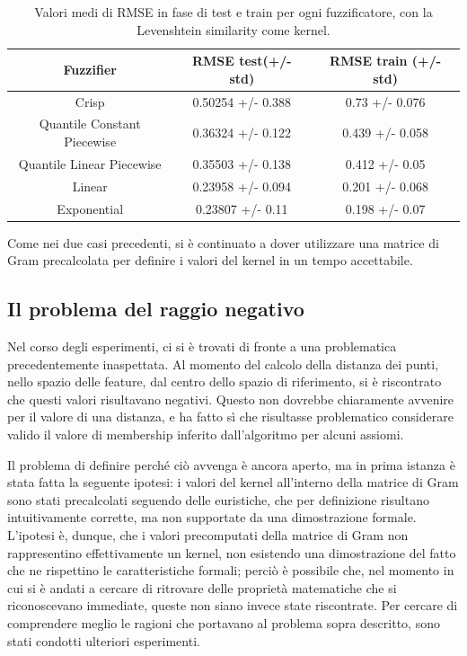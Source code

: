\documentclass[12pt,a4paper]{report}
\begin{document}
\begin{table}[h!]
\small
\centering 	
	\begin{tabular}{|c|c|c|} 
	 \hline
	  Fuzzifier & RMSE test(+/- std) & RMSE train (+/- std)\\ [0.5ex] 
	 \hline
	 Crisp & 0.50254 +/- 0.388 & 0.73 +/- 0.076 \\ 
	 \hline
	 Quantile Constant Piecewise & 0.36324 +/- 0.122 & 0.439 +/- 0.058\\
	 \hline
	 Quantile Linear Piecewise & 0.35503 +/- 0.138	 & 0.412 +/- 0.05\\
	 \hline
	 Linear & 0.23958 +/- 0.094 & 0.201 +/- 0.068\\
	 \hline
	 Exponential & 0.23807 +/- 0.11 & 0.198 +/- 0.07\\ [1ex] 
	 \hline
	\end{tabular}
	\caption{Valori medi di RMSE in fase di test e train per ogni fuzzificatore, con la Levenshtein similarity come kernel.}
	\label{table:risultatiLevenshtein}
\end{table}

Come nei due casi precedenti, si è continuato a dover utilizzare una matrice di Gram precalcolata per definire i valori del kernel in un tempo accettabile.

\subsection{Il problema del raggio negativo}

Nel corso degli esperimenti, ci si è trovati di fronte a una problematica precedentemente inaspettata. 
Al momento del calcolo della distanza dei punti, nello spazio delle feature, dal centro dello spazio di riferimento, si è riscontrato che questi valori risultavano negativi. Questo non dovrebbe chiaramente avvenire per il valore di una distanza, e ha fatto sì che risultasse problematico considerare valido il valore di membership inferito dall'algoritmo per alcuni assiomi.

Il problema di definire perché ciò avvenga è ancora aperto, ma in prima istanza è stata fatta la seguente ipotesi: i valori del kernel all'interno della matrice di Gram sono stati precalcolati seguendo delle euristiche, che per definizione risultano intuitivamente corrette, ma non supportate da una dimostrazione formale. L'ipotesi è, dunque, che i valori precomputati della matrice di Gram non rappresentino effettivamente un kernel, non esistendo una dimostrazione del fatto che ne  rispettino le caratteristiche formali; perciò è possibile che, nel momento in cui si è andati a cercare di ritrovare delle proprietà matematiche che si riconoscevano immediate, queste non siano invece state riscontrate. 
Per cercare di comprendere meglio le ragioni che portavano al problema sopra descritto, sono stati condotti ulteriori esperimenti.
\end{document}
